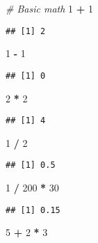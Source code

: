 \documentclass[
]{article}
\newenvironment{Shaded}{\begin{snugshade}}{\end{snugshade}}
\newcommand{\CommentTok}[1]{\textcolor[rgb]{0.56,0.35,0.01}{\textit{#1}}}
\newcommand{\DecValTok}[1]{\textcolor[rgb]{0.00,0.00,0.81}{#1}}
\newcommand{\OperatorTok}[1]{\textcolor[rgb]{0.81,0.36,0.00}{\textbf{#1}}}
\newcommand{\StringTok}[1]{\textcolor[rgb]{0.31,0.60,0.02}{#1}}
\begin{document}
\begin{Shaded}
\begin{Highlighting}[]
\CommentTok{# Basic math}
\DecValTok{1} \OperatorTok{+}\StringTok{ }\DecValTok{1}
\end{Highlighting}
\end{Shaded}

\begin{verbatim}
## [1] 2
\end{verbatim}

\begin{Shaded}
\begin{Highlighting}[]
\DecValTok{1} \OperatorTok{-}\StringTok{ }\DecValTok{1}
\end{Highlighting}
\end{Shaded}

\begin{verbatim}
## [1] 0
\end{verbatim}

\begin{Shaded}
\begin{Highlighting}[]
\DecValTok{2} \OperatorTok{*}\StringTok{ }\DecValTok{2}
\end{Highlighting}
\end{Shaded}

\begin{verbatim}
## [1] 4
\end{verbatim}

\begin{Shaded}
\begin{Highlighting}[]
\DecValTok{1} \OperatorTok{/}\StringTok{ }\DecValTok{2}
\end{Highlighting}
\end{Shaded}

\begin{verbatim}
## [1] 0.5
\end{verbatim}

\begin{Shaded}
\begin{Highlighting}[]
\DecValTok{1} \OperatorTok{/}\StringTok{ }\DecValTok{200} \OperatorTok{*}\StringTok{ }\DecValTok{30}
\end{Highlighting}
\end{Shaded}

\begin{verbatim}
## [1] 0.15
\end{verbatim}

\begin{Shaded}
\begin{Highlighting}[]
\DecValTok{5} \OperatorTok{+}\StringTok{ }\DecValTok{2} \OperatorTok{*}\StringTok{ }\DecValTok{3}
\end{Highlighting}
\end{Shaded}
\end{document}
